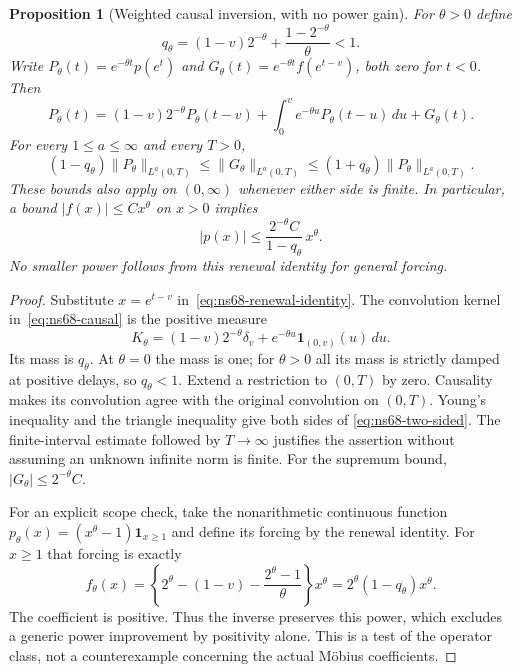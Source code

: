 \documentclass[11pt]{article}
\newtheorem{proposition}[theorem]{Proposition}
\theoremstyle{remark}
\begin{document}
\begin{proposition}[Weighted causal inversion, with no power gain]
\label{prop:ns68-weighted-inversion}
For $\theta>0$ define
\[
 q_\theta=(1-v)2^{-\theta}+\frac{1-2^{-\theta}}\theta<1.
\]
Write $P_\theta(t)=e^{-\theta t}p(e^t)$ and
$G_\theta(t)=e^{-\theta t}f(e^{t-v})$, both zero for $t<0$.
Then
\begin{equation}
 P_\theta(t)=(1-v)2^{-\theta}P_\theta(t-v)
       +\int_0^v e^{-\theta u}P_\theta(t-u)\,du+G_\theta(t).
 \label{eq:ns68-causal}
\end{equation}
For every $1\leq a\leq\infty$ and every $T>0$,
\begin{equation}
 (1-q_\theta)\|P_\theta\|_{L^a(0,T)}
 \leq\|G_\theta\|_{L^a(0,T)}
 \leq(1+q_\theta)\|P_\theta\|_{L^a(0,T)}.
 \label{eq:ns68-two-sided}
\end{equation}
These bounds also apply on $(0,\infty)$ whenever either side is
finite. In particular, a bound $|f(x)|\leq Cx^\theta$ on $x>0$
implies
\begin{equation}
 |p(x)|\leq\frac{2^{-\theta}C}{1-q_\theta}\,x^\theta.
 \label{eq:ns68-sup-transfer}
\end{equation}
No smaller power follows from this renewal identity for general forcing.
\end{proposition}
\begin{proof}
Substitute $x=e^{t-v}$ in~\eqref{eq:ns68-renewal-identity}. The
convolution kernel in~\eqref{eq:ns68-causal} is the positive measure
\[
 K_\theta=(1-v)2^{-\theta}\delta_v
              +e^{-\theta u}\mathbf1_{(0,v)}(u)\,du.
\]
Its mass is $q_\theta$. At $\theta=0$ the mass is one; for
$\theta>0$ all its mass is strictly damped at positive delays, so
$q_\theta<1$. Extend a restriction to $(0,T)$ by zero. Causality
makes its convolution agree with the original convolution on $(0,T)$.
Young's inequality and the triangle inequality give both sides of
\eqref{eq:ns68-two-sided}. The finite-interval estimate followed by
$T\to\infty$ justifies the assertion without assuming an unknown
infinite norm is finite. For the supremum bound,
$|G_\theta|\leq2^{-\theta}C$.

For an explicit scope check, take the nonarithmetic continuous function
$p_\theta(x)=(x^\theta-1)\mathbf1_{x\geq1}$ and define its forcing
by the renewal identity. For $x\geq1$ that forcing is exactly
\[
 f_\theta(x)=\left\{2^\theta-(1-v)
                  -\frac{2^\theta-1}{\theta}\right\}x^\theta
            =2^\theta(1-q_\theta)x^\theta.
\]
The coefficient is positive. Thus the inverse preserves this power,
which excludes a generic power improvement by positivity alone. This
is a test of the operator class, not a counterexample concerning the
actual M\"obius coefficients.
\end{proof}
\end{document}
